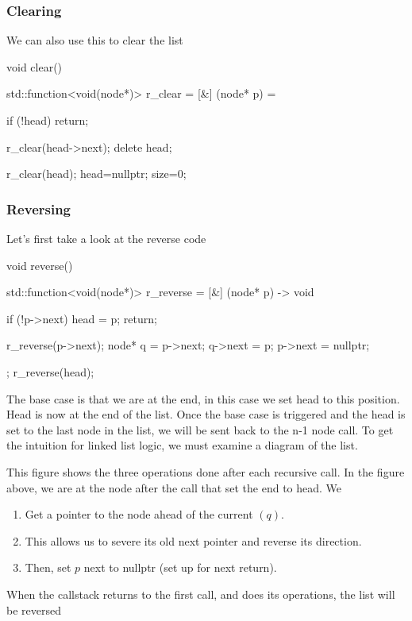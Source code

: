 \documentclass{report}
\begin{document}
\bigbreak \noindent 
\subsubsection{Clearing}
\bigbreak \noindent \bigbreak \noindent 
We can also use this to clear the list
\bigbreak \noindent 
\begin{cppcode}
    void clear() {
        std::function<void(node*)> r_clear = [&] (node* p) = {
            if (!head) return;

            r_clear(head->next);
            delete head;
        } 
        r_clear(head);
        head=nullptr;
        size=0;
    }
\end{cppcode}


\pagebreak 
\subsubsection{Reversing}
\bigbreak \noindent 
Let's first take a look at the reverse code
\bigbreak \noindent 
\begin{cppcode}
    void reverse() {
        std::function<void(node*)> r_reverse = [&] (node* p) -> void {
            if (!p->next) {
                head = p;
                return;
            }

            r_reverse(p->next);
            node* q = p->next;
            q->next = p;
            p->next = nullptr;

        };
        r_reverse(head);
    }
\end{cppcode}
\bigbreak \noindent 
The base case is that we are at the end, in this case we set head to this position. Head is now at the end of the list.
\bigbreak \noindent 
Once the base case is triggered and the head is set to the last node in the list, we will be sent back to the n-1 node call.
\bigbreak \noindent 
To get the intuition for linked list logic, we must examine a diagram of the list.
\bigbreak \noindent 
\begin{figure}[ht]
    \centering
    \label{fig:diag}
\end{figure}
\bigbreak \noindent 
This figure shows the three operations done after each recursive call. In the figure above, we are at the node after the call that set the end to head. We
\begin{enumerate}
    \item Get a pointer to the node ahead of the current $(q)$. 
    \item This allows us to severe its old next pointer and reverse its direction.
    \item Then, set $p$ next to nullptr (set up for next return).
\end{enumerate}
When the callstack returns to the first call, and does its operations, the list will be reversed
\end{document}

